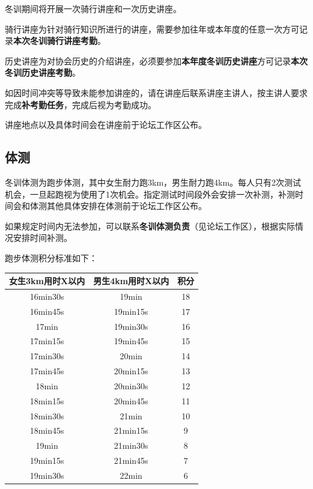 \documentclass[UTF8]{ctexart}
\begin{document}
冬训期间将开展一次骑行讲座和一次历史讲座。

骑行讲座为针对骑行知识所进行的讲座，需要参加往年或本年度的任意一次方可记录\textbf{本次冬训骑行讲座考勤}。

历史讲座为对协会历史的介绍讲座，必须要参加\textbf{本年度冬训历史讲座}方可记录\textbf{本次冬训历史讲座考勤}。

如因时间冲突等导致未能参加讲座的，请在讲座后联系讲座主讲人，按主讲人要求完成\textbf{补考勤任务}，完成后视为考勤成功。

讲座地点以及具体时间会在讲座前于论坛工作区公布。

\subsection{体测}

冬训体测为跑步体测，其中女生耐力跑3km，男生耐力跑4km。每人只有2次测试机会，一旦起跑视为使用了1次机会。指定测试时间段外会安排一次补测，补测时间会和体测其他具体安排在体测前于论坛工作区公布。

如果规定时间内无法参加，可以联系\textbf{冬训体测负责}（见论坛工作区），根据实际情况安排时间补测。

跑步体测积分标准如下：

\begin{table}[h]
    \centering
    \begin{tabular}{|c|c|c|}
    \hline
    女生3km用时X以内 & 男生4km用时X以内 & 积分 \\ \hline
    16min30s   & 19min      & 18 \\ \hline
    16min45s   & 19min15s   & 17 \\ \hline
    17min      & 19min30s   & 16 \\ \hline
    17min15s   & 19min45s   & 15 \\ \hline
    17min30s   & 20min      & 14 \\ \hline
    17min45s   & 20min15s   & 13 \\ \hline
    18min      & 20min30s   & 12 \\ \hline
    18min15s   & 20min45s   & 11 \\ \hline
    18min30s   & 21min      & 10 \\ \hline
    18min45s   & 21min15s   & 9  \\ \hline
    19min      & 21min30s   & 8  \\ \hline
    19min15s   & 21min45s   & 7  \\ \hline
    19min30s   & 22min      & 6  \\ \hline
    \end{tabular}\label{test}
    \end{table}
\end{document}

